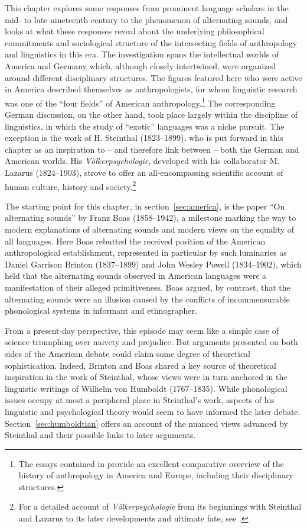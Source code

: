 \documentclass[output=paper]{langscibook}
\begin{document}
This chapter explores some responses from prominent language scholars in the mid- to late nineteenth century to the phenomenon of alternating sounds, and looks at what these responses reveal about the underlying philosophical commitments and sociological structure of the intersecting fields of anthropology and linguistics in this era. The investigation spans the intellectual worlds of America and Germany which, although closely intertwined, were organized around different disciplinary structures. The figures featured here who were active in America described themselves as anthropologists, for whom linguistic research was one of the ``four fields'' of American anthropology.\footnote{The essays contained in \citet{Kuklick2008} provide an excellent comparative overview of the history of anthropology in America and Europe, including their disciplinary structures.} The corresponding German discussion, on the other hand, took place largely within the discipline of linguistics, in which the study of ``exotic'' languages was a niche pursuit. The exception is the work of H. Steinthal (1823–1899), who is put forward in this chapter as an inspiration to – and therefore link between – both the German and American worlds. His \emph{Völkerpsychologie}, developed with his collaborator M. Lazarus (1824–1903), strove to offer an all-encompassing scientific account of human culture, history and society.\footnote{For a detailed account of \emph{Völkerpsychologie} from its beginnings with Steinthal and Lazarus to its later developments and ultimate fate, see \citet{Klautke2013}.}

The starting point for this chapter, in section~\ref{sec:america}, is the \citeyear{Boas1889} paper ``On alternating sounds'' by Franz Boas (1858–1942), a milestone marking the way to modern explanations of alternating sounds and modern views on the equality of all languages. Here Boas rebutted the received position of the American anthropological establishment, represented in particular by such luminaries as Daniel Garrison Brinton (1837–1899) and John Wesley Powell (1834–1902), which held that the alternating sounds observed in American languages were a manifestation of their alleged primitiveness. Boas argued, by contrast, that the alternating sounds were an illusion caused by the conflicts of incommensurable phonological systems in informant and ethnographer.

From a present-day perspective, this episode may seem like a simple case of science triumphing over naivety and prejudice. But arguments presented on both sides of the American debate could claim some degree of theoretical sophistication. Indeed, Brinton and Boas shared a key source of theoretical inspiration in the work of Steinthal, whose views were in turn anchored in the linguistic writings of Wilhelm von Humboldt (1767–1835). While phonological issues occupy at most a peripheral place in Steinthal's work, aspects of his linguistic and psychological theory would seem to have informed the later debate. Section~\ref{sec:humboldtian} offers an account of the nuanced views advanced by Steinthal and their possible links to later arguments.
\end{document}
